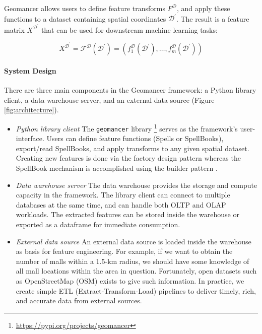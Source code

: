 \documentclass{article}
\begin{document}
Geomancer allows users to define feature transforms $F^{\mathcal{D}}$, and
apply these functions to a dataset containing spatial coordinates
$\mathcal{D}^{\prime}$. The result is a feature matrix $X^{\mathcal{D}^\prime}$
\cite{smith2017ballet} that can be used for downstream machine learning tasks: 

\begin{equation}
    X^{\mathcal{D}^\prime} = 
    \mathcal{F}^{\mathcal{D}}(\mathcal{D}^\prime) = 
    (f_{1}^{\mathcal{D}}(\mathcal{D}^\prime), \dots,
    f_{m}^{\mathcal{D}}(\mathcal{D}^\prime))
\end{equation}

\paragraph{System Design} There are three main components in the Geomancer
framework: a Python library client, a data warehouse server, and an external
data source (Figure \ref{fig:architecture}). 

\begin{itemize}
    \item \textit{Python library client} The \texttt{geomancer} library
        \footnote{\url{https://pypi.org/projects/geomancer}} serves as the
        framework's user-interface. Users can define feature functions
        (Spells or SpellBooks), export/read SpellBooks, and apply transforms to
        any given spatial dataset. Creating new features is done via the
        factory design pattern whereas the SpellBook mechanism is accomplished
        using the builder pattern \cite{gamma1995design}.
    \item \textit{Data warehouse server} The data warehouse provides the storage and
        compute capacity in the framework. The library client can connect to multiple
        databases at the same time, and can handle both OLTP and OLAP
        workloads. The extracted features can be stored
        inside the warehouse or exported as a dataframe for immediate
        consumption.
    \item \textit{External data source} An external data source is loaded
        inside the warehouse as basis for feature engineering. For example, if
        we want to obtain the number of malls within a 1.5-km radius, we should
        have some knowledge of all mall locations within the area in
        question. Fortunately, open datasets such as OpenStreetMap (OSM)
        \cite{osm2017} exists to give such information. In practice, we create
        simple ETL (Extract-Transform-Load) pipelines to deliver timely, rich,
        and accurate data from external sources. 
\end{itemize}
\end{document}
